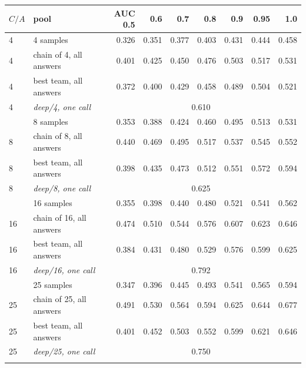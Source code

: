 \begin{tabular}{llrrrrrrr}
\toprule
$C/A$ & pool & AUC 0.5 & 0.6 & 0.7 & 0.8 & 0.9 & 0.95 & 1.0 \\ \midrule
4 & 4 samples & 0.326 & 0.351 & 0.377 & 0.403 & 0.431 & 0.444 & 0.458 \\
4 & chain of 4, all answers & 0.401 & 0.425 & 0.450 & 0.476 & 0.503 & 0.517 & 0.531 \\
4 & best team, all answers & 0.372 & 0.400 & 0.429 & 0.458 & 0.489 & 0.504 & 0.521 \\
4 & \emph{deep/4, one call} & \multicolumn{7}{c}{0.610} \\
\addlinespace
8 & 8 samples & 0.353 & 0.388 & 0.424 & 0.460 & 0.495 & 0.513 & 0.531 \\
8 & chain of 8, all answers & 0.440 & 0.469 & 0.495 & 0.517 & 0.537 & 0.545 & 0.552 \\
8 & best team, all answers & 0.398 & 0.435 & 0.473 & 0.512 & 0.551 & 0.572 & 0.594 \\
8 & \emph{deep/8, one call} & \multicolumn{7}{c}{0.625} \\
\addlinespace
16 & 16 samples & 0.355 & 0.398 & 0.440 & 0.480 & 0.521 & 0.541 & 0.562 \\
16 & chain of 16, all answers & 0.474 & 0.510 & 0.544 & 0.576 & 0.607 & 0.623 & 0.646 \\
16 & best team, all answers & 0.384 & 0.431 & 0.480 & 0.529 & 0.576 & 0.599 & 0.625 \\
16 & \emph{deep/16, one call} & \multicolumn{7}{c}{0.792} \\
\addlinespace
25 & 25 samples & 0.347 & 0.396 & 0.445 & 0.493 & 0.541 & 0.565 & 0.594 \\
25 & chain of 25, all answers & 0.491 & 0.530 & 0.564 & 0.594 & 0.625 & 0.644 & 0.677 \\
25 & best team, all answers & 0.401 & 0.452 & 0.503 & 0.552 & 0.599 & 0.621 & 0.646 \\
25 & \emph{deep/25, one call} & \multicolumn{7}{c}{0.750} \\
\addlinespace
\bottomrule
\end{tabular}
